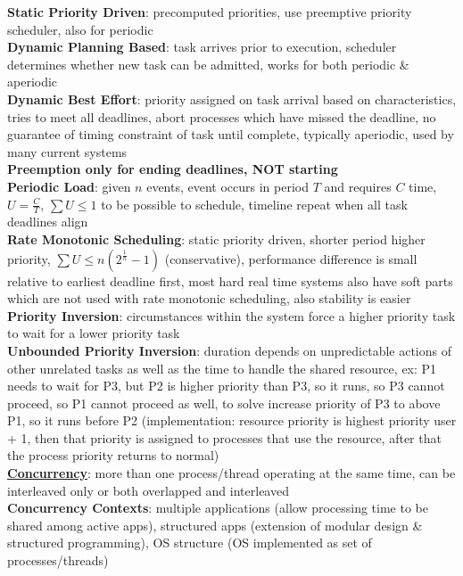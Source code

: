 \documentclass[a4paper]{article}
\begin{document}
\begin{multicols}{2}
        \textbf{Static Priority Driven}: precomputed priorities, use preemptive priority scheduler, also for periodic\\
        \textbf{Dynamic Planning Based}: task arrives prior to execution, scheduler determines whether new task can be admitted, works for both periodic \& aperiodic\\
        \textbf{Dynamic Best Effort}: priority assigned on task arrival based on characteristics, tries to meet all deadlines, abort processes which have missed the deadline, no guarantee of timing constraint of task until complete, typically aperiodic, used by many current systems\\
        \textbf{Preemption only for ending deadlines, NOT starting}\\
        \textbf{Periodic Load}: given $n$ events, event occurs in period $T$ and requires $C$ time, $U = \frac{C}{T}$, $\sum U \leq 1$ to be possible to schedule, timeline repeat when all task deadlines align\\
        \textbf{Rate Monotonic Scheduling}: static priority driven, shorter period higher priority, $\sum U \leq n(2^{\frac{1}{n}}-1)$ (conservative), performance difference is small relative to earliest deadline first, most hard real time systems also have soft parts which are not used with rate monotonic scheduling, also stability is easier\\
        \textbf{Priority Inversion}: circumstances within the system force a higher priority task to wait for a lower priority task\\
        \textbf{Unbounded Priority Inversion}: duration depends on unpredictable actions of other unrelated tasks as well as the time to handle the shared resource, ex: P1 needs to wait for P3, but P2 is higher priority than P3, so it runs, so P3 cannot proceed, so P1 cannot proceed as well, to solve increase priority of P3 to above P1, so it runs before P2 (implementation: resource priority is highest priority user + 1, then that priority  is assigned to processes that use the resource, after that the process priority returns to normal)\\
        \underline{\textbf{Concurrency}}: more than one process/thread operating at the same time, can be interleaved only or both overlapped and interleaved\\
        \textbf{Concurrency Contexts}: multiple applications (allow processing time to be shared among active apps), structured apps (extension of modular design \& structured programming), OS structure (OS implemented as set of processes/threads)\\

\end{multicols}
\end{document}
